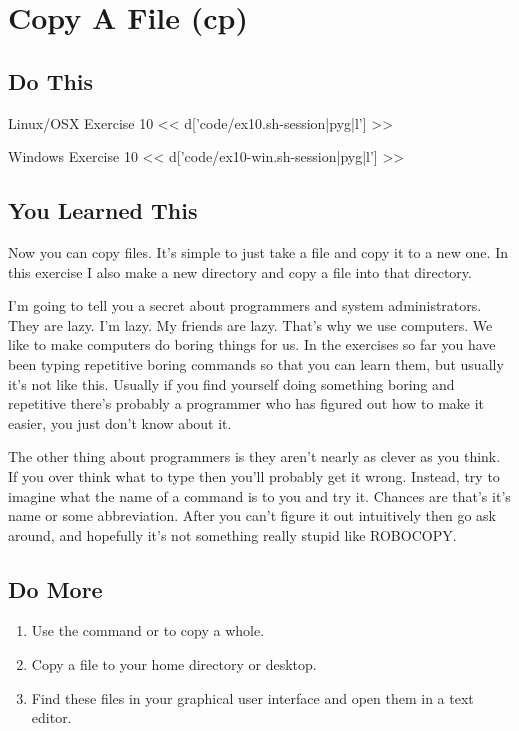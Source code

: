 \chapter{Copy A File (cp)}

\section{Do This}

\begin{code}{Linux/OSX Exercise 10}
<< d['code/ex10.sh-session|pyg|l'] >>
\end{code}

\begin{code}{Windows Exercise 10}
<< d['code/ex10-win.sh-session|pyg|l'] >>
\end{code}

\section{You Learned This}

Now you can copy files.  It's simple to just take a file and copy it to a new
one.  In this exercise I also make a new directory and copy a file into that
directory.

I'm going to tell you a secret about programmers and system administrators.
They are lazy.  I'm lazy.  My friends are lazy.  That's why we use computers.
We like to make computers do boring things for us.  In the exercises so far
you have been typing repetitive boring commands so that you can learn them,
but usually it's not like this.  Usually if you find yourself doing something
boring and repetitive there's probably a programmer who has figured out
how to make it easier, you just don't know about it.

The other thing about programmers is they aren't nearly as clever as you
think.  If you over think what to type then you'll probably get it wrong.
Instead, try to imagine what the name of a command is to you and try it.
Chances are that's it's name or some abbreviation.  After you can't figure
it out intuitively then go ask around, and hopefully it's not something
really stupid like ROBOCOPY.


\section{Do More}

\begin{enumerate}
\item Use the  command or  to copy a
    whole.
\item Copy a file to your home directory or desktop.
\item Find these files in your graphical user interface and open them
    in a text editor.
\end{enumerate}


